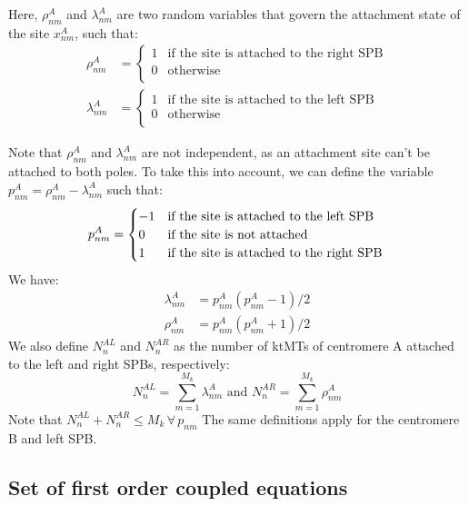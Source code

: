 \documentclass[a4paper,12pt]{article}
\renewcommand{\leq}{\leqslant}
\begin{document}
Here, $\rho_{nm}^A$ and $\lambda_{nm}^A$ are two random variables that govern
the attachment state of the site $x_{nm}^A$, such that:
\begin{align}
  \label{eq:rholambda}
  \rho_{nm}^A &= 
  \begin{cases}
    1 &\text{if the site is attached to the right SPB}\\
    0 &\text{otherwise}\\
  \end{cases}\\
  \lambda_{nm}^A &=
  \begin{cases}
    1 &\text{if the site is attached to the left SPB}\\
    0 &\text{otherwise}\\
  \end{cases}
\end{align}

Note that $\rho_{nm}^A$ and $\lambda_{nm}^A$ are not independent, as
an attachment site can't be attached to both poles. To take this into
account, we can define the variable $p_{nm}^A = \rho_{nm}^A -
\lambda_{nm}^A$ such that:
\begin{equation}
  \label{eq:pnm}
  p_{nm}^A = 
  \begin{cases}
    - 1 &\text{if the site is attached to the left SPB}\\
    0 &\text{if the site is not attached}\\
    1 &\text{if the site is attached to the right SPB}\\
  \end{cases}\\
\end{equation}
We have:
\begin{align}
  \lambda_{nm}^A &= p_{nm}^A\left(p_{nm}^A - 1\right)/2\\
  \rho_{nm}^A &= p_{nm}^A\left(p_{nm}^A + 1\right)/2
\end{align}
We also define $N_n^{AL}$ and $N_n^{AR}$ as the number of ktMTs of
centromere A attached to the left and right SPBs, respectively:
\begin{equation}
  \label{eq:NAL}
  N_n^{AL} = \sum_{m = 1}^{M_k}\lambda_{nm}^A \mbox{ and }%
  N_n^{AR} = \sum_{m = 1}^{M_k}\rho_{nm}^A 
\end{equation}
Note that $N_n^{AL} + N_n^{AR} \leq M_k\, \forall\, p_{nm} $
The same definitions apply for the centromere B and left SPB.

\subsection{Set of first order coupled equations}
\end{document}

